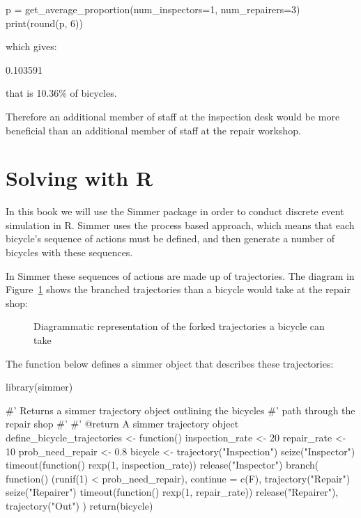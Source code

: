 \begin{pyin}
p = get_average_proportion(num_inspectors=1, num_repairers=3)
print(round(p, 6))
\end{pyin}

which gives:

\begin{pyout}
0.103591
\end{pyout}

that is 10.36\% of bicycles.

Therefore an additional member of staff at the inspection desk would be more
beneficial than an additional member of staff at the repair workshop.


\section{Solving with R}\label{sec:discrete_event_simulation_solving-with-R}

In this book we will use the Simmer package in order to conduct discrete event
simulation in R.  Simmer uses the process based approach, which means that each
bicycle's sequence of actions must be defined, and then generate a number of
bicycles with these sequences.

In Simmer these sequences of actions are made up of trajectories. The
diagram in Figure~\ref{fig:processbased_diagram} shows the branched
trajectories than a bicycle would take at the repair shop:

\begin{figure}
\begin{center}

\caption{Diagrammatic representation of the forked trajectories a bicycle can take}
\label{fig:processbased_diagram}
\end{center}
\end{figure}

The function below defines a simmer object that describes these trajectories:

\begin{Rin}
library(simmer)

#' Returns a simmer trajectory object outlining the bicycles
#' path through the repair shop
#'
#' @return A simmer trajectory object
define_bicycle_trajectories <- function() {
  inspection_rate <- 20
  repair_rate <- 10
  prob_need_repair <- 0.8
  bicycle <-
    trajectory("Inspection") %
    seize("Inspector") %
    timeout(function() {rexp(1, inspection_rate)}) %
    release("Inspector") %
    branch(
      function() (runif(1) < prob_need_repair),
      continue = c(F),
      trajectory("Repair") %
        seize("Repairer") %
        timeout(function() {rexp(1, repair_rate)}) %
        release("Repairer"),
      trajectory("Out")
    )
  return(bicycle)
}
\end{Rin}

